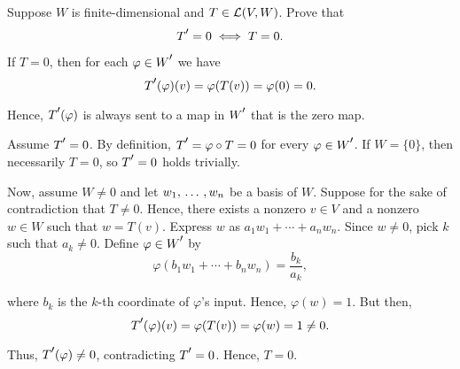 \begin{xrcs}
  Suppose $W$ is finite-dimensional and $T \in \mathcal{L} (V,W)$. Prove that
  \begin{equation}
    \dual{T} = 0 \iff T = 0.
  \end{equation}
  \begin{xprf}
    \Leftarrowdirection If $T = 0$, then for each $\varphi \in \dual{W}$ we have
    \begin{equation}
      \dual{T} (\varphi) (v) = \varphi(T(v)) = \varphi(0) = 0.
    \end{equation}

    Hence, $\dual{T} (\varphi)$ is always sent to a map in $\dual{W}$ that is the zero map.

    \Rightarrowdirection Assume $\dual{T} = 0$. By definition, $\dual{T} = \varphi \circ T = 0$ for every $\varphi \in \dual{W}$. If $W = \{0\}$, then necessarily $T = 0$, so $\dual{T} = 0$ holds trivially.

    Now, assume $W \neq 0$ and let $w_1, {\, \ldots \,\,}, w_n$ be a basis of $W$. Suppose for the sake of contradiction that $T \neq 0$. Hence, there exists a nonzero $v \in V$ and a nonzero $w \in W$ such that $w=T(v)$. Express $w$ as $a_1 w_1 + \cdots + a_n w_n$. Since $w \neq 0$, pick $k$ such that $a_k \neq 0$. Define $\varphi \in \dual{W}$ by
    \begin{equation}
      \varphi(b_1 w_1 + \cdots + b_n w_n) = \frac{b_k}{a_k},
    \end{equation}

    where $b_k$ is the $k$-th coordinate of $\varphi$'s input. Hence, $\varphi(w) =1$.
    But then,
    \begin{equation}
      \dual{T}(\varphi) (v) = \varphi(T(v)) = \varphi(w) = 1 \neq 0.
    \end{equation}

    Thus, $\dual{T}(\varphi) \neq 0$, contradicting $\dual{T} = 0$. Hence, $T = 0$.
  \end{xprf}
\end{xrcs}